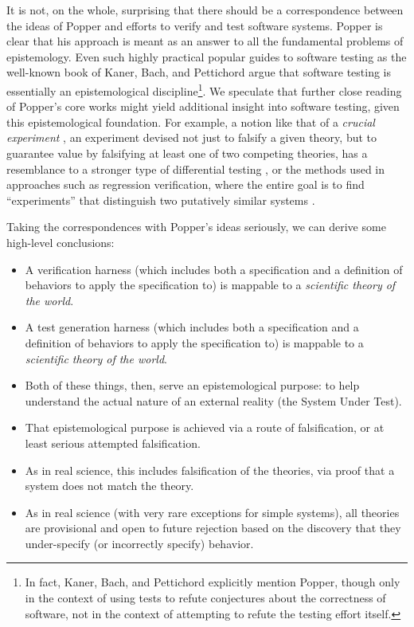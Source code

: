 \documentclass{svjour3}
\begin{document}
It is not, on the whole, surprising that there should be a
correspondence between the ideas of Popper and efforts to verify
and test software systems.  Popper is clear that his approach is meant
as an answer to all the fundamental problems of epistemology.  Even
such highly practical popular guides to software testing as the
well-known book of Kaner, Bach, and Pettichord \cite{kaner} argue that
software testing is essentially an epistemological
discipline\footnote{In fact, Kaner, Bach, and Pettichord explicitly
  mention Popper, though only in the context of using tests to refute
  conjectures about the correctness of software, not in the context of
  attempting to refute the testing effort itself.}.  We speculate that
further close reading of Popper's core works might yield additional
insight into software testing, given this epistemological foundation.
For example, a notion like that of a \emph{crucial experiment}
\cite{Popper}, an experiment
devised not just to falsify a given theory, but to guarantee value by
falsifying at least one of two competing theories, has a resemblance
to a stronger type of differential testing \cite{Differential}, or the
methods used in approaches such as regression verification, where the
entire goal is to find ``experiments'' that distinguish two putatively
similar systems \cite{strichman2008regression}.


Taking the correspondences with Popper's ideas seriously, we can derive
some high-level conclusions:

\begin{itemize}
\item A verification harness (which includes both a specification and a
  definition of behaviors to apply the specification to) is mappable
 to a \emph{scientific theory of the world}.
\item A test generation harness (which includes both a specification and a
  definition of behaviors to apply the specification to) is mappable
 to a \emph{scientific theory of the world}.
\item Both of these things, then, serve an epistemological purpose:
  to help understand the actual nature of an external reality (the
  System Under Test).
\item That epistemological purpose is achieved via a route of
  falsification, or at least serious attempted falsification.
\item As in real science, this includes falsification of the theories,
  via proof that a system does not match the theory.
\item As in real science (with very rare exceptions for simple
  systems), all theories are provisional and open to future rejection
  based on the discovery that they under-specify (or incorrectly
  specify) behavior.
\end{itemize}
\end{document}
